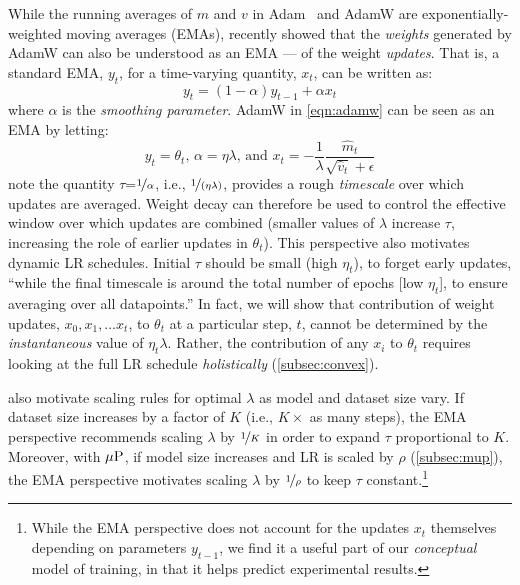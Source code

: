 While the running averages of $m$ and $v$ in
Adam~\citep{kingma2014adam} and AdamW are exponentially-weighted
moving averages (EMAs), \citet{wang2024how} recently showed that the
\emph{weights} generated by AdamW can also be understood as an EMA ---
of the weight \emph{updates}.  That is, a standard EMA, $y_t$, for a
time-varying quantity, $x_t$, can be written as:
\begin{equation}\label{eqn:ema}
y_t = (1 - \alpha)y_{t-1} + \alpha x_t
\end{equation}
where $\alpha$ is the \emph{smoothing parameter}.  AdamW in
\cref{eqn:adamw} can be seen as an EMA by letting:
\begin{equation}\label{eqn:adamwema}
y_t=\theta_t\mbox{, }\alpha=\eta\lambda\mbox{, and }
x_t=-\frac{1}{\lambda}\frac{\hat{m}_t}{\sqrt{\hat{v}_t} + \epsilon}
\end{equation}
\citeauthor{wang2024how} note the quantity
$\tau$=$\nicefrac{1}{\alpha}$, i.e., $\nicefrac{1}{(\eta\lambda)}$,
provides a rough \emph{timescale} over which updates are averaged.
%
Weight decay can therefore be used to control the effective window
over which updates are combined (smaller values of $\lambda$ increase
$\tau$, increasing the role of earlier updates in $\theta_t$).
%
This perspective also motivates dynamic LR schedules.  Initial $\tau$
should be small (high $\eta_t$), to forget early updates, ``while the
final timescale is around the total number of epochs [low $\eta_t$],
to ensure averaging over all datapoints.''
%
In fact, we will show that contribution of weight updates, $x_0, x_1,
\ldots x_{t}$, to $\theta_t$ at a particular step, $t$, cannot be
determined by the \emph{instantaneous} value of $\eta_t\lambda$.
Rather, the contribution of any $x_i$ to $\theta_t$ requires looking
at the full LR schedule \emph{holistically} (\cref{subsec:convex}).

\citeauthor{wang2024how} also motivate scaling rules for optimal
$\lambda$ as model and dataset size vary.  If dataset size increases
by a factor of $K$ (i.e., $K\times$ as many steps), the EMA
perspective recommends scaling $\lambda$ by $\nicefrac{1}{K}$ in order
to expand $\tau$ proportional to $K$.
%
Moreover, with $\mbox{$\mu$P}$, if model size increases and LR is scaled by
$\rho$ (\cref{subsec:mup}), the EMA perspective motivates scaling
$\lambda$ by $\nicefrac{1}{\rho}$ to keep $\tau$
constant.\footnote{While the EMA perspective does not account for the
updates $x_t$ themselves depending on parameters $y_{t-1}$, we find it
a useful part of our \emph{conceptual} model of training, in that it
helps predict experimental results.}
%
%
